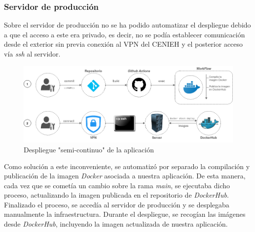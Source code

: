 \documentclass[
]{article}
\begin{document}
\hypertarget{servidor-de-producciuxf3n}{%
\subsubsection{Servidor de producción}\label{servidor-de-producciuxf3n}}

Sobre el servidor de producción no se ha podido automatizar el
despliegue debido a que el acceso a este era privado, es decir, no se
podía establecer comunicación desde el exterior sin previa conexión al
VPN del CENIEH y el posterior acceso vía \emph{ssh} al servidor.

\begin{figure}
\hypertarget{dockerdeploy}{%
\centering
\includegraphics{../_static/images/dockerdeploy.png}
\caption{Despliegue "semi-continuo" de la
aplicación}\label{dockerdeploy}
}
\end{figure}

Como solución a este inconveniente, se automatizó por separado la
compilación y publicación de la imagen \emph{Docker} asociada a nuestra
aplicación. De esta manera, cada vez que se cometía un cambio sobre la
rama \emph{main}, se ejecutaba dicho proceso, actualizando la imagen
publicada en el repositorio de \emph{DockerHub}. Finalizado el proceso,
se accedía al servidor de producción y se desplegaba manualmente la
infraestructura. Durante el despliegue, se recogían las imágenes desde
\emph{DockerHub}, incluyendo la imagen actualizada de nuestra
aplicación.
\end{document}
